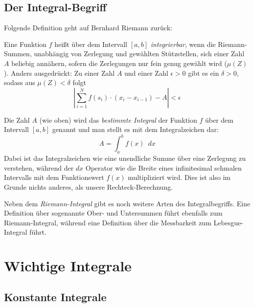 \subsection{Der Integral-Begriff}

Folgende Definition geht auf Bernhard Riemann zurück:

\begin{definition}
Eine Funktion $f$ heißt über dem Intervall $[a,b]$ \emph{integrierbar}, wenn die Riemann-Summen, unabhängig von Zerlegung und gewählten Stützstellen, sich einer Zahl $A$ beliebig annähern, sofern die Zerlegungen nur fein genug gewählt wird ($\mu(Z)$). Anders ausgedrückt: Zu einer Zahl $A$ und einer Zahl $\epsilon >0$ gibt es ein $\delta >0$, sodass aus $\mu(Z)<\delta$ folgt
\begin{equation}
\left| \sum_{i=1}^{N} f(s_i)\cdot (x_{i}-x_{i-1}) -A \right| < \epsilon
\end{equation}
\end{definition}

\begin{definition}
Die Zahl $A$ (wie oben) wird das \emph{bestimmte Integral} der Funktion $f$ über dem Intervall $[a,b]$ genannt und man stellt es mit dem Integralzeichen dar:
\begin{equation}
A = \int_{a}^{b} f(x) \enspace dx
\end{equation}
Dabei ist das Integralzeichen wie eine unendliche Summe über eine Zerlegung zu verstehen, während der $dx$ Operator wie die Breite eines infinitesimal schmalen Intervalls mit dem Funktionswert $f(x)$ multipliziert wird. Dies ist also im Grunde nichts anderes, als unsere Rechteck-Berechnung.
\end{definition}

Neben dem \emph{Riemann-Integral} gibt es noch weitere Arten des Integralbegriffs. Eine Definition über sogenannte Ober- und Untersummen führt ebenfalls zum Riemann-Integral, während eine Definition über die Messbarkeit zum Lebesgue-Integral führt.

\section{Wichtige Integrale}

\subsection{Konstante Integrale}

